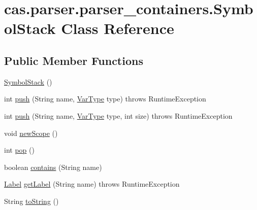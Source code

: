 \hypertarget{classcas_1_1parser_1_1parser__containers_1_1_symbol_stack}{\section{cas.\-parser.\-parser\-\_\-containers.\-Symbol\-Stack Class Reference}
\label{classcas_1_1parser_1_1parser__containers_1_1_symbol_stack}
}
\subsection*{Public Member Functions}
\begin{DoxyCompactItemize}
\item 
\hyperlink{classcas_1_1parser_1_1parser__containers_1_1_symbol_stack_a99930d1eae7f8060cd7d03a7f1c16b89}{Symbol\-Stack} ()
\item 
int \hyperlink{classcas_1_1parser_1_1parser__containers_1_1_symbol_stack_a84827706b4ac1c4f24491197641dc52e}{push} (String name, \hyperlink{enumcas_1_1machine_1_1_virtual_machine_1_1_var_type}{Var\-Type} type)  throws Runtime\-Exception
\item 
int \hyperlink{classcas_1_1parser_1_1parser__containers_1_1_symbol_stack_a396b5cb2f1a978c1c063dadb0a4e47b7}{push} (String name, \hyperlink{enumcas_1_1machine_1_1_virtual_machine_1_1_var_type}{Var\-Type} type, int size)  throws Runtime\-Exception
\item 
void \hyperlink{classcas_1_1parser_1_1parser__containers_1_1_symbol_stack_ae23e6c6b34777b5411ab87e0a76021e8}{new\-Scope} ()
\item 
int \hyperlink{classcas_1_1parser_1_1parser__containers_1_1_symbol_stack_a15d5084fb2d228c973133dbed1bea9f6}{pop} ()
\item 
boolean \hyperlink{classcas_1_1parser_1_1parser__containers_1_1_symbol_stack_ab883f94f9381cceb66ffef719b1bc9d7}{contains} (String name)
\item 
\hyperlink{classcas_1_1parser_1_1parser__containers_1_1_label}{Label} \hyperlink{classcas_1_1parser_1_1parser__containers_1_1_symbol_stack_abeb44281cfe750d43c65e56e4312bcd9}{get\-Label} (String name)  throws Runtime\-Exception
\item 
String \hyperlink{classcas_1_1parser_1_1parser__containers_1_1_symbol_stack_ac3a5a77bda4b08d6b87f3996c6cbf687}{to\-String} ()
\end{DoxyCompactItemize}


